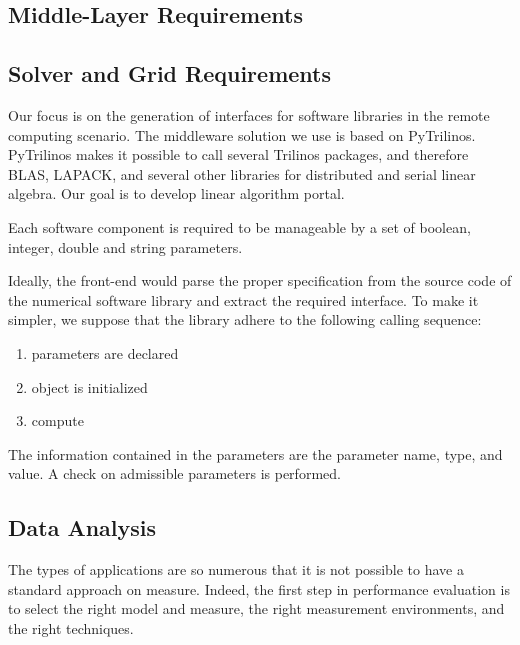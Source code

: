 \documentclass[11pt,relax]{SANDreport}
\begin{document}
\subsection{Middle-Layer Requirements}

\subsection{Solver and Grid Requirements}

Our focus is on the generation of interfaces for software libraries in the
remote computing scenario. The middleware solution we use is based on
PyTrilinos. PyTrilinos makes it possible to call several Trilinos packages,
  and therefore BLAS, LAPACK, and several other libraries for distributed and
  serial linear algebra. Our goal is to develop linear algorithm portal.

Each  software component is  required to be manageable by a set of boolean,
integer, double and string parameters. 

Ideally, the front-end would parse the proper specification from the source
code of the numerical software library and extract the required interface. To
make it simpler, we suppose that the library adhere to the following calling
sequence:
\begin{enumerate}
\item parameters are declared
\item object is initialized
\item compute
\end{enumerate}
The information contained in the parameters are the parameter name, type, and
value. A check on admissible parameters is performed.

\subsection{Data Analysis}

The types of applications
are so numerous that it is not possible to have a standard approach on
measure. Indeed, the first step in performance evaluation is to select the
right model and measure, the right measurement environments, and the right
techniques.
\end{document}

